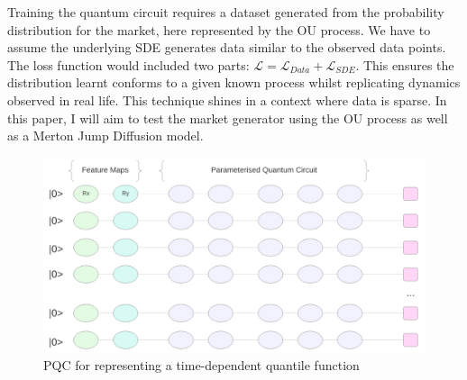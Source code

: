 \documentclass[12pt]{article}
\numberwithin{equation}{section}
\begin{document}
Training the quantum circuit requires a dataset generated from the probability 
distribution for the market, here represented by the OU process. We have to assume
the underlying SDE generates data similar to the observed data points. The loss 
function would included two parts: $\mathcal{L} = \mathcal{L}_{Data} + 
\mathcal{L}_{SDE}$. This ensures the distribution learnt conforms to a given 
known process whilst replicating dynamics observed in real life. This technique 
shines in a context where data is sparse. In this paper, I will aim to test the 
market generator using the OU process as well as a Merton Jump Diffusion model.
\begin{figure}[ht!]
    \centering
    \includegraphics[scale=0.45]{qfc.png}
    \caption{PQC for representing a time-dependent quantile function }
\end{figure}
\end{document}
